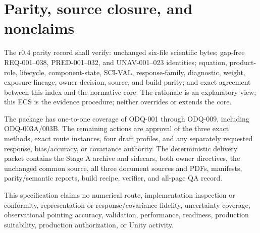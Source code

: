 \documentclass[11pt]{article}
\begin{document}
\section{Parity, source closure, and nonclaims}

The r0.4 parity record shall verify: unchanged six-file scientific bytes;
gap-free REQ-001--038, PRED-001--032, and UNAV-001--023 identities; equation,
product-role, lifecycle, component-state, SCI-VAL, response-family, diagnostic,
weight, exposure-lineage, owner-decision, source, and build parity; and exact
agreement between this index and the normative core. The rationale is an
explanatory view; this ECS is the evidence procedure; neither overrides or
extends the core.

The package has one-to-one coverage of ODQ-001 through ODQ-009, including
ODQ-003A/003B. The remaining actions are approval of the three exact methods,
exact route instances, four draft profiles, and any separately requested
response, bias/accuracy, or covariance authority. The deterministic delivery
packet contains the Stage A archive and sidecars, both owner directives, the
unchanged common source, all three document sources and PDFs, manifests,
parity/semantic reports, build recipe, verifier, and all-page QA record.

This specification claims no numerical route, implementation inspection or
conformity, representation or response/covariance fidelity, uncertainty
coverage, observational pointing accuracy, validation, performance, readiness,
production suitability, production authorization, or Unity activity.
\end{document}
